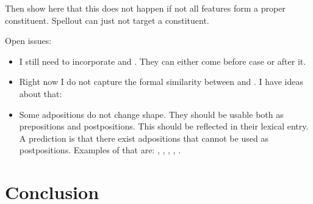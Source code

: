 \documentclass{article}
\begin{document}
Then show here that this does not happen if not all features form a proper constituent. Spellout can just not target a constituent.



Open issues:

\begin{itemize}
  \item I still need to incorporate  and . They can either come before case or after it.
  \item Right now I do not capture the formal similarity between  and . I have ideas about that:
  \item Some adpositions do not change shape. They should be usable both as prepositions and postpositions. This should be reflected in their lexical entry. A prediction is that there exist adpositions that cannot be used as postpositions. Examples of that are: , , , , .
\end{itemize}

\section{Conclusion}

\printbibliography
\end{document}
